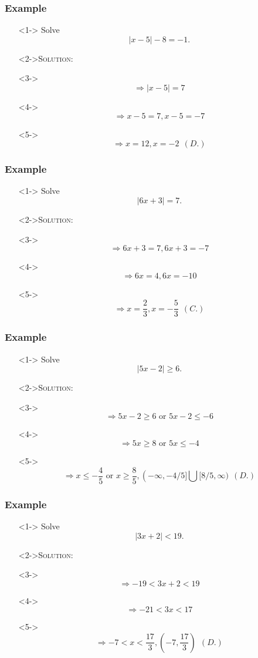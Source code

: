 \documentclass{beamer}
\begin{document}
\begin{frame}
	\frametitle{Example}
	\begin{enumerate}
		\item[]<1-> Solve \[ |x-5|-8=-1. \]
		\item[]<2->\textsc{Solution:}
		\item[]<3-> \[ \Rightarrow |x-5|=7 \]
    \item[]<4-> \[ \Rightarrow x-5=7, x-5=-7  \]
    \item[]<5-> \[ \Rightarrow x=12, x=-2 ~~(D.) \]
	\end{enumerate}
\end{frame}

\begin{frame}
	\frametitle{Example}
	\begin{enumerate}
		\item[]<1-> Solve \[ |6x+3|=7. \]
		\item[]<2->\textsc{Solution:}
		\item[]<3-> \[ \Rightarrow 6x+3=7, 6x+3=-7 \]
    \item[]<4-> \[ \Rightarrow 6x=4, 6x=-10  \]
    \item[]<5-> \[ \Rightarrow x=\frac{2}{3}, x=-\frac{5}{3} ~~(C.) \]
	\end{enumerate}
\end{frame}

\begin{frame}
	\frametitle{Example}
	\begin{enumerate}
		\item[]<1-> Solve \[ |5x-2| \geq 6. \]
		\item[]<2->\textsc{Solution:}
		\item[]<3-> \[ \Rightarrow 5x-2 \geq 6 \text{ or } 5x-2 \leq -6 \]
    \item[]<4-> \[ \Rightarrow 5x \geq 8 \text{ or } 5x \leq -4  \]
    \item[]<5-> \[ \Rightarrow x \leq -\frac{4}{5} \text{ or } x \geq \frac{8}{5}, \left( -\infty, -4/5] \bigcup [8/5, \infty) ~~(D.) \]
	\end{enumerate}
\end{frame}

\begin{frame}
	\frametitle{Example}
	\begin{enumerate}
		\item[]<1-> Solve \[ |3x+2| < 19. \]
		\item[]<2->\textsc{Solution:}
		\item[]<3-> \[ \Rightarrow -19<3x+2<19 \]
    \item[]<4-> \[ \Rightarrow -21<3x<17  \]
    \item[]<5-> \[ \Rightarrow -7<x<\frac{17}{3}, \left( -7, \frac{17}{3} \right) ~~(D.) \]
	\end{enumerate}
\end{frame}
\end{document}
